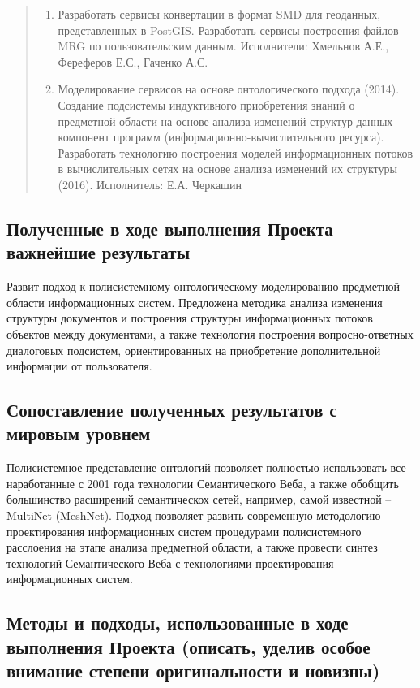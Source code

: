 \documentclass[12pt,a4paper]{ltxdoc}
\begin{document}
\begin{quote}
\begin{enumerate}
\item Разработать сервисы конвертации в формат SMD для геоданных, представленных в PostGIS. Разработать сервисы построения файлов MRG по пользовательским данным. Исполнители: Хмельнов А.Е., Фереферов Е.С., Гаченко А.С.

\item Моделирование сервисов на основе онтологического подхода (2014). Создание подсистемы индуктивного приобретения знаний о предметной области на основе анализа изменений структур данных компонент программ (информационно-вычислительного ресурса). Разработать технологию построения моделей информационных потоков в вычислительных сетях на основе анализа изменений их структуры (2016). Исполнитель: Е.А. Черкашин
\end{enumerate}
\end{quote}

\subsection{Полученные в ходе выполнения Проекта важнейшие результаты}
Развит подход к полисистемному онтологическому моделированию предметной области информационных систем.  Предложена методика анализа изменения структуры документов и построения структуры информационных потоков объектов между документами, а также технология построения вопросно-ответных диалоговых подсистем, ориентированных на приобретение дополнительной информации от пользователя.

\subsection{Сопоставление полученных результатов с мировым уровнем}
Полисистемное представление онтологий позволяет полностью использовать все наработанные с 2001 года технологии Семантического Веба, а также обобщить большинство расширений семантическох сетей, например, самой известной -- MultiNet (MeshNet).  Подход позволяет развить современную методологию проектирования информационных систем процедурами полисистемного расслоения на этапе анализа предметной области, а также провести синтез технологий Семантического Веба с технологиями проектирования информационных систем.

\subsection{Методы и подходы, использованные в ходе выполнения Проекта (описать,
  уделив особое внимание степени оригинальности и новизны)}
\end{document}
